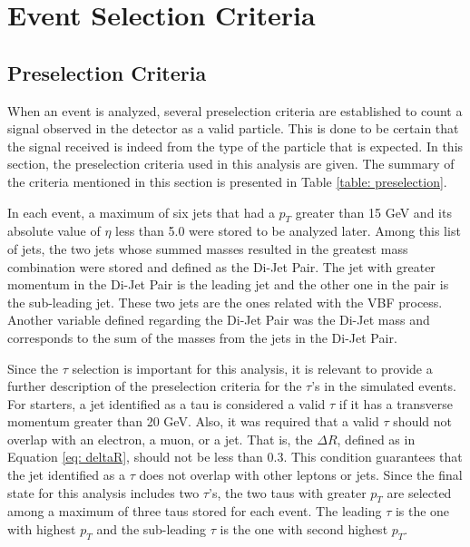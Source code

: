 \graphicspath{{SelectionCriteria/Figures/}}

\chapter{Event Selection Criteria}

\section{Preselection Criteria}

When an event is analyzed, several preselection criteria are established to count a signal observed in the detector as a valid particle. This is done to be certain that the signal received is indeed from the type of the particle that is expected. In this section, the preselection criteria used in this analysis are given. The summary of the criteria mentioned in this section is presented in Table \ref{table: preselection}. 

In each event, a maximum of six jets that had a $p_{T}$ greater than 15 GeV and its absolute value of $\eta$ less than 5.0 were stored to be analyzed later. Among this list of jets, the two jets whose summed masses resulted in the greatest mass combination were stored and defined as the Di-Jet Pair. The jet with greater momentum in the Di-Jet Pair is the leading jet and the other one in the pair is the sub-leading jet. These two jets are the ones related with the VBF process. Another variable defined regarding the Di-Jet Pair was the Di-Jet mass and corresponds to the sum of the masses from the jets in the Di-Jet Pair.  

Since the $\tau$ selection is important for this analysis, it is relevant to provide a further description of the preselection criteria for the $\tau$'s in the simulated events. For starters, a jet identified as a tau is considered a valid $\tau$ if it has a transverse momentum greater than 20 GeV. Also, it was required that a valid $\tau$ should not overlap with an electron, a muon, or a jet. That is, the $\Delta R$, defined as in Equation \ref{eq: deltaR}, should not be less than 0.3. This condition guarantees that the jet identified as a $\tau$ does not overlap with other leptons or jets. Since the final state for this analysis includes two $\tau$'s, the two taus with greater $p_{T}$ are selected among a maximum of three taus stored for each event. The leading $\tau$ is the one with highest $p_{T}$ and the sub-leading $\tau$ is the one with second highest $p_{T}$.

